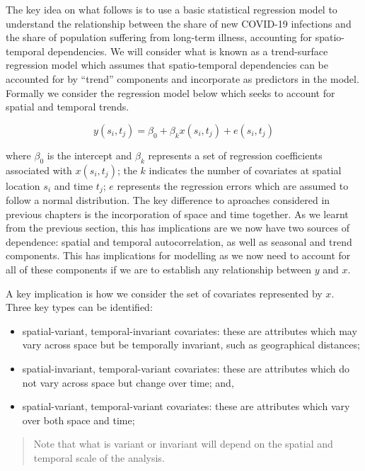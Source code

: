 \documentclass[
  letterpaper,
  krantz2]{style/krantz}
\begin{document}
The key idea on what follows is to use a basic statistical regression
model to understand the relationship between the share of new COVID-19
infections and the share of population suffering from long-term illness,
accounting for spatio-temporal dependencies. We will consider what is
known as a trend-surface regression model which assumes that
spatio-temporal dependencies can be accounted for by ``trend''
components and incorporate as predictors in the model. Formally we
consider the regression model below which seeks to account for spatial
and temporal trends.

\[y(s_{i}, t_{j}) = \beta_{0} + \beta_{k}x(s_{i}, t_{j}) + e(s_{i}, t_{j})\]

where \(\beta_{0}\) is the intercept and \(\beta_{k}\) represents a set
of regression coefficients associated with \(x(s_{i}, t_{j})\); the
\(k\) indicates the number of covariates at spatial location \(s_{i}\)
and time \(t_{j}\); \(e\) represents the regression errors which are
assumed to follow a normal distribution. The key difference to aproaches
considered in previous chapters is the incorporation of space and time
together. As we learnt from the previous section, this has implications
are we now have two sources of dependence: spatial and temporal
autocorrelation, as well as seasonal and trend components. This has
implications for modelling as we now need to account for all of these
components if we are to establish any relationship between \(y\) and
\(x\).

A key implication is how we consider the set of covariates represented
by \(x\). Three key types can be identified:

\begin{itemize}
\item
  spatial-variant, temporal-invariant covariates: these are attributes
  which may vary across space but be temporally invariant, such as
  geographical distances;
\item
  spatial-invariant, temporal-variant covariates: these are attributes
  which do not vary across space but change over time; and,
\item
  spatial-variant, temporal-variant covariates: these are attributes
  which vary over both space and time;
\end{itemize}

\begin{quote}
Note that what is variant or invariant will depend on the spatial and
temporal scale of the analysis.
\end{quote}
\end{document}
